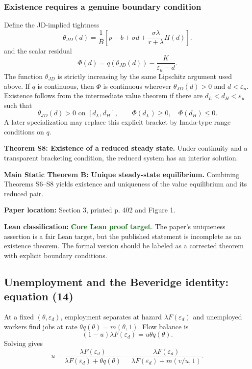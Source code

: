 \documentclass[11pt]{article}
\newcommand{\epsd}{\varepsilon_d}
\newcommand{\epsu}{\varepsilon_u}
\newcommand{\paperloc}[1]{\textbf{Paper location:} #1}
\newcommand{\leanclass}[1]{\textbf{Lean classification:} #1}
\newcommand{\core}{\textcolor{darkGreen}{\textbf{Core Lean proof target}}}
\newcommand{\resultname}[1]{\medskip\noindent\textbf{#1.}}
\begin{document}
\subsubsection*{Existence requires a genuine boundary condition}

Define the JD-implied tightness
\begin{equation}
 \theta_{JD}(d)=\frac{1}{B}
 \left[p-b+\sigma d+\frac{\sigma\lambda}{r+\lambda}H(d)\right] . \tag{ThetaJD}
\end{equation}
and the scalar residual
\begin{equation}
 \Phi(d)=q(\theta_{JD}(d))-\frac{K}{\epsu-d}. \tag{Phi}
\end{equation}
The function $\theta_{JD}$ is strictly increasing by the same Lipschitz argument used above. If $q$ is continuous, then $\Phi$ is continuous wherever $\theta_{JD}(d)>0$ and $d<\epsu$. Existence follows from the intermediate value theorem if there are $d_L<d_H<\epsu$ such that
\[
 \theta_{JD}(d)>0\text{ on }[d_L,d_H],
 \qquad \Phi(d_L)\ge 0,\quad \Phi(d_H)\le 0.
\]
A later specialization may replace this explicit bracket by Inada-type range conditions on $q$.

\resultname{Theorem S8: Existence of a reduced steady state}
Under continuity and a transparent bracketing condition, the reduced system has an interior solution.

\resultname{Main Static Theorem B: Unique steady-state equilibrium}
Combining Theorems S6--S8 yields existence and uniqueness of the value equilibrium and its reduced pair.

\paperloc{Section 3, printed p. 402 and Figure 1.}

\leanclass{\core.}
The paper's uniqueness assertion is a fair Lean target, but the published statement is incomplete as an existence theorem. The formal version should be labeled as a corrected theorem with explicit boundary conditions.

\subsection{Unemployment and the Beveridge identity: equation (14)}

At a fixed $(\theta,\epsd)$, employment separates at hazard $\lambda F(\epsd)$ and unemployed workers find jobs at rate $\theta q(\theta)=m(\theta,1)$. Flow balance is
\[
 (1-u)\lambda F(\epsd)=u\theta q(\theta).
\]
Solving gives
\begin{equation}
 u=\frac{\lambda F(\epsd)}{\lambda F(\epsd)+\theta q(\theta)}
 =\frac{\lambda F(\epsd)}{\lambda F(\epsd)+m(v/u,1)}. \tag{14}
\end{equation}
\end{document}
